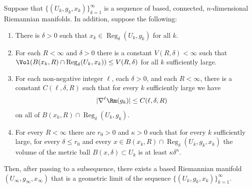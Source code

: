 \begin{theorem}\label{thm:geometric-limit-existence}
\notready
\label{basicconv}

Suppose that $\{(U_k,g_k,x_k)\}_{k=1}^\infty$ is a sequence of
based, connected, $n$-dimensional Riemannian manifolds. In addition,
suppose the following:

\begin{enumerate}
\item[(1)] There is $\delta>0$ such that $x_k\in \operatorname{Reg}_\delta(U_k,g_k)$ for all $k$.
\item[(2)] For each $R<\infty$ and $\delta>0$ there is a constant $V(R,\delta)<\infty$ such
that $\Vol(B(x_k,R)\cap \operatorname{Reg}_\delta(U_k,x_k))\le
V(R,\delta)$ for all $k$ sufficiently large.
\item[(3)] For each non-negative integer $\ell$, each $\delta>0$, and each $R<\infty$,
 there is a constant
$C(\ell,\delta,R)$ such that for every $k$ sufficiently large we
have
$$|\nabla^\ell \Rm(g_k)|\le C(\ell,\delta,R)$$
on all of $B(x_k,R)\cap\operatorname{Reg}_\delta(U_k,g_k)$.
\item[(4)] For every $R<\infty$ there are $r_0>0$ and $\kappa>0$ such that
for every $k$ sufficiently large, for every $\delta\le r_0$ and
every $x\in B(x_k,R)\cap \operatorname{Reg}_\delta(U_k,g_k,x_k)$ the volume
of the metric ball $B(x,\delta)\subset U_k$ is at least
$\kappa\delta^n$.
\end{enumerate}
Then, after passing to a subsequence, there exists a based
Riemannian manifold $(U_\infty,g_\infty,x_\infty)$ that is a
geometric limit of the sequence $\{(U_k,g_k,x_k)\}_{k=1}^\infty$.
\end{theorem}



